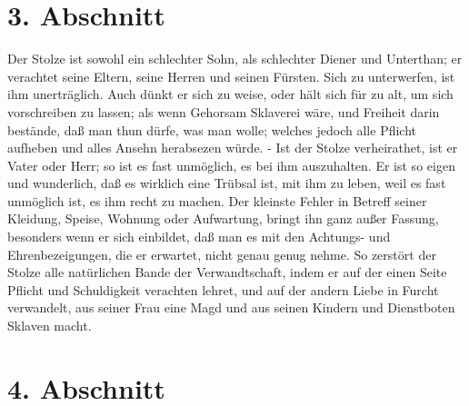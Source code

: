 \section{3. Abschnitt} \label{kap12_ab3}

Der Stolze ist sowohl ein schlechter Sohn, als schlechter Diener und Unterthan;
er verachtet seine Eltern, seine Herren und seinen Fürsten. Sich zu unterwerfen,
ist ihm unerträglich. Auch dünkt er sich zu weise, oder hält sich für zu alt, um
sich vorschreiben zu lassen; als wenn Gehorsam Sklaverei wäre, und Freiheit
darin bestände, daß man thun dürfe, was man wolle; welches jedoch alle Pflicht
aufheben und alles Ansehn herabsezen würde. - Ist der Stolze verheirathet, ist
er Vater oder Herr; so ist es fast unmöglich, es bei ihm auszuhalten. Er ist so
eigen und wunderlich, daß es wirklich eine Trübsal ist, mit ihm zu leben, weil
es fast unmöglich ist, es ihm recht zu machen. Der kleinste Fehler in Betreff
seiner Kleidung, Speise, Wohnung oder Aufwartung, bringt ihn ganz außer Fassung,
besonders wenn er sich einbildet, daß man es mit den Achtungs- und
Ehrenbezeigungen, die er erwartet, nicht genau genug nehme. So zerstört der
Stolze alle natürlichen Bande der Verwandtschaft, indem er auf der einen Seite
Pflicht und Schuldigkeit verachten lehret, und auf der andern Liebe in Furcht
verwandelt, aus seiner Frau eine Magd und aus seinen Kindern und Dienstboten
Sklaven macht.

\section{4. Abschnitt} \label{kap12_ab4}

